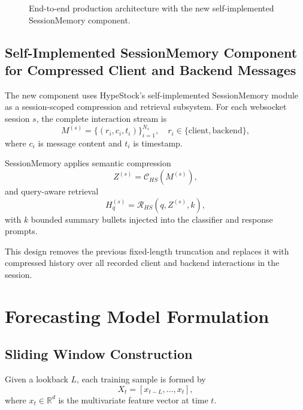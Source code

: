 \documentclass{article}
\begin{document}
\begin{figure}[t]
\caption{End-to-end production architecture with the new self-implemented SessionMemory component.}
\label{fig:architecture}
\end{figure}

\subsection{Self-Implemented SessionMemory Component for Compressed Client and Backend Messages}
The new component uses HypeStock's self-implemented SessionMemory module as a session-scoped compression and retrieval subsystem. For each websocket session $s$, the complete interaction stream is
\begin{equation}
M^{(s)}=\{(r_i,c_i,t_i)\}_{i=1}^{N_s}, \quad r_i \in \{\text{client},\text{backend}\},
\end{equation}
where $c_i$ is message content and $t_i$ is timestamp.

SessionMemory applies semantic compression
\begin{equation}
Z^{(s)}=\mathcal{C}_{HS}(M^{(s)}),
\end{equation}
and query-aware retrieval
\begin{equation}
H_q^{(s)}=\mathcal{R}_{HS}(q,Z^{(s)},k),
\end{equation}
with $k$ bounded summary bullets injected into the classifier and response prompts.

This design removes the previous fixed-length truncation and replaces it with compressed history over all recorded client and backend interactions in the session.

\section{Forecasting Model Formulation}
\subsection{Sliding Window Construction}
Given a lookback $L$, each training sample is formed by
\begin{equation}
X_t=[x_{t-L},\ldots,x_t],
\end{equation}
where $x_t \in \mathbb{R}^d$ is the multivariate feature vector at time $t$.
\end{document}
